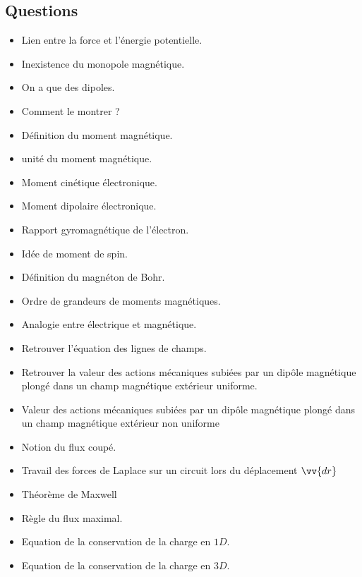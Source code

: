\documentclass[a4paper, 11pt, hidelinks]{article}
\begin{document}
\subsection{Questions}


\begin{itemize}
    \item Lien entre la force et l'énergie potentielle. \cite{Chapitre12}
    \item Inexistence du monopole magnétique. \cite{Chapitre12}
    \item On a que des dipoles. \cite{Chapitre12}
    \item Comment le montrer ? \cite{Chapitre12}
    \item Définition du moment magnétique. \cite{Chapitre12}
    \item unité du moment magnétique. \cite{Chapitre12}
    \item Moment cinétique électronique. \cite{Chapitre12}
    \item Moment dipolaire électronique. \cite{Chapitre12}
    \item Rapport gyromagnétique de l'électron. \cite{Chapitre12}
    \item Idée de moment de spin. \cite{Chapitre12}
    \item Définition du magnéton de Bohr. \cite{Chapitre12}
    \item Ordre de grandeurs de moments magnétiques. \cite{Chapitre12}
    \item Analogie entre électrique et magnétique. \cite{Chapitre12}
    \item Retrouver l'équation des lignes de champs. \cite{Chapitre12}
    \item Retrouver la valeur des actions mécaniques subiées par un dipôle magnétique plongé dans un champ magnétique extérieur uniforme. \cite{Chapitre12}
    \item Valeur des actions mécaniques subiées par un dipôle magnétique plongé dans un champ magnétique extérieur non uniforme \cite{Chapitre12}
    \item Notion du flux coupé. \cite{Chapitre12}
    \item Travail des forces de Laplace sur un circuit lors du déplacement $\vv{dr}$ \cite{Chapitre12}
    \item Théorème de Maxwell \cite{Chapitre12}
    \item Règle du flux maximal. \cite{Chapitre12}
    \item Equation de la conservation de la charge en $1D$. \cite{Chapitre13}
    \item Equation de la conservation de la charge en $3D$. \cite{Chapitre13}
\end{itemize}
\end{document}
